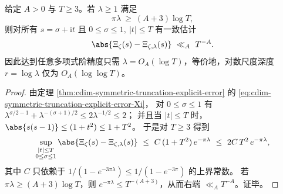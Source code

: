 \begin{corollary}\label{cor:cdim-symmetric-truncation-loglog-depth}
给定 \(A>0\) 与 \(T\ge 3\)。若 \(\lambda\ge 1\) 满足
\[
\pi\lambda\ \ge\ (A+3)\log T,
\]
则对所有 \(s=\sigma+\mathrm{i}t\) 且 \(0\le\sigma\le 1,\ |t|\le T\) 有一致估计
\[
\abs{\Xi_\zeta(s)-\Xi_{\zeta,\lambda}(s)}\ \ll_A\ T^{-A}.
\]
因此达到任意多项式阶精度只需 \(\lambda=O_A(\log T)\)，等价地，对数尺度深度 \(r=\log\lambda\) 仅为 \(O_A(\log\log T)\)。
\end{corollary}
\begin{proof}
由定理 \ref{thm:cdim-symmetric-truncation-explicit-error} 的 \eqref{eq:cdim-symmetric-truncation-explicit-error-Xi}，
对 \(0\le\sigma\le 1\) 有
\(
\lambda^{\sigma/2-1}+\lambda^{-(\sigma+1)/2}\le 2\lambda^{-1/2}\le 2
\)；
并且当 \(|t|\le T\) 时，
\(
\abs{s(s-1)}\le (1+t^2)\le 1+T^2
\)。
于是对 \(T\ge 3\) 得到
\[
\sup_{\substack{|t|\le T\\ 0\le\sigma\le 1}}
\abs{\Xi_\zeta(s)-\Xi_{\zeta,\lambda}(s)}
\ \le\ C\,(1+T^2)\,e^{-\pi\lambda}
\ \le\ 2C\,T^2\,e^{-\pi\lambda},
\]
其中 \(C\) 只依赖于 \(1/(1-e^{-3\pi\lambda})\le 1/(1-e^{-3\pi})\) 的上界常数。
若 \(\pi\lambda\ge (A+3)\log T\)，则 \(e^{-\pi\lambda}\le T^{-(A+3)}\)，从而右端 \(\ll_A T^{-A}\)。证毕。
\end{proof}

